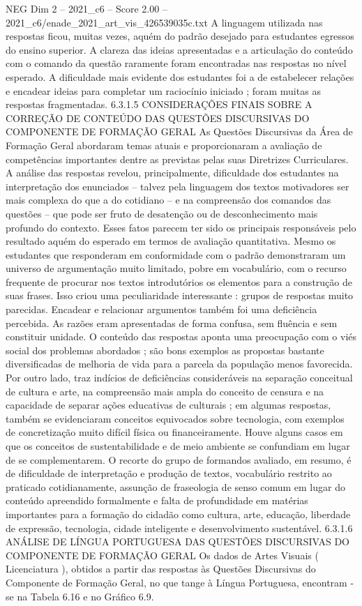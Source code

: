 \begin{textsample}{NEG Dim 2 – 2021\_c6 – Score 2.00 – 2021\_c6/enade\_2021\_art\_vis\_426539035c.txt}
A linguagem utilizada nas respostas ficou, muitas vezes, aquém do padrão desejado para estudantes egressos do ensino superior.
A clareza das ideias apresentadas e a articulação do conteúdo com o comando da questão raramente foram encontradas nas respostas no nível esperado.
A dificuldade mais evidente dos estudantes foi a de estabelecer relações e encadear ideias para completar um raciocínio iniciado ; foram muitas as respostas fragmentadas. 6.3.1.5 CONSIDERAÇÕES FINAIS SOBRE A CORREÇÃO DE CONTEÚDO DAS QUESTÕES DISCURSIVAS DO COMPONENTE DE FORMAÇÃO GERAL As Questões Discursivas da Área de Formação Geral abordaram temas atuais e proporcionaram a avaliação de competências importantes dentre as previstas pelas suas Diretrizes Curriculares.
A análise das respostas revelou, principalmente, dificuldade dos estudantes na interpretação dos enunciados – talvez pela linguagem dos textos motivadores ser mais complexa do que a do cotidiano – e na compreensão dos comandos das questões – que pode ser fruto de desatenção ou de desconhecimento mais profundo do contexto.
Esses fatos parecem ter sido os principais responsáveis pelo resultado aquém do esperado em termos de avaliação quantitativa.
Mesmo os estudantes que responderam em conformidade com o padrão demonstraram um universo de argumentação muito limitado, pobre em vocabulário, com o recurso frequente de procurar nos textos introdutórios os elementos para a construção de suas frases.
Isso criou uma peculiaridade interessante : grupos de respostas muito parecidas.
Encadear e relacionar argumentos também foi uma deficiência percebida.
As razões eram apresentadas de forma confusa, sem fluência e sem constituir unidade.
O conteúdo das respostas aponta uma preocupação com o viés social dos problemas abordados ; são bons exemplos as propostas bastante diversificadas de melhoria de vida para a parcela da população menos favorecida.
Por outro lado, traz indícios de deficiências consideráveis na separação conceitual de cultura e arte, na compreensão mais ampla do conceito de censura e na capacidade de separar ações educativas de culturais ; em algumas respostas, também se evidenciaram conceitos equivocados sobre tecnologia, com exemplos de concretização muito difícil física ou financeiramente.
Houve alguns casos em que os conceitos de sustentabilidade e de meio ambiente se confundiam em lugar de se complementarem.
O recorte do grupo de formandos avaliado, em resumo, é de dificuldade de interpretação e produção de textos, vocabulário restrito ao praticado cotidianamente, assunção de fraseologia de senso comum em lugar do conteúdo apreendido formalmente e falta de profundidade em matérias importantes para a formação do cidadão como cultura, arte, educação, liberdade de expressão, tecnologia, cidade inteligente e desenvolvimento sustentável. 6.3.1.6 ANÁLISE DE LÍNGUA PORTUGUESA DAS QUESTÕES DISCURSIVAS DO COMPONENTE DE FORMAÇÃO GERAL Os dados de Artes Visuais ( Licenciatura ), obtidos a partir das respostas às Questões Discursivas do Componente de Formação Geral, no que tange à Língua Portuguesa, encontram -se na Tabela 6.16 e no Gráfico 6.9.

\end{textsample}
